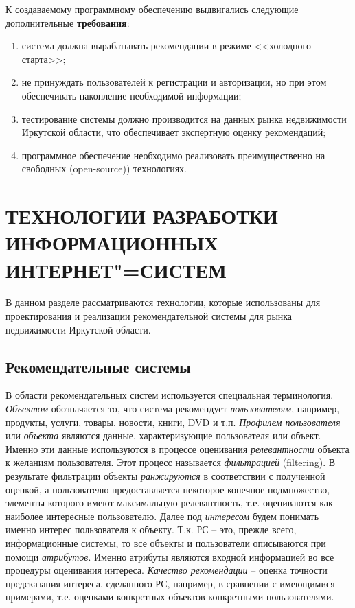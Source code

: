 \documentclass[a4paper,14pt,openany,final]{extreport} %
\begin{document}
К создаваемому программному обеспечению выдвигались следующие дополнительные \textbf{требования}:
\begin{enumerate}
\item система должна вырабатывать рекомендации в режиме <<холодного старта>>;
\item не принуждать пользователей к регистрации и авторизации, но при этом обеспечивать накопление необходимой информации;
\item тестирование системы должно производится на данных рынка недвижимости Иркутской области, что обеспечивает экспертную оценку рекомендаций;
\item программное обеспечение необходимо реализовать преимущественно на свободных (\foreignlanguage{english}{open-source)}) технологиях.
\end{enumerate}

\chapter{ТЕХНОЛОГИИ РАЗРАБОТКИ ИНФОРМАЦИОННЫХ ИНТЕРНЕТ"=СИСТЕМ}
\label{chap:dev-tech-theory}

В данном разделе рассматриваются технологии, которые использованы для проектирования и реализации рекомендательной системы для рынка недвижимости Иркутской области.

\section{Рекомендательные системы}
\label{sec:domain-descr}

В области рекомендательных систем используется специальная терминология. \emph{Объектом} обозначается то, что система рекомендует \emph{пользователям}, например, продукты, услуги, товары, новости, книги, DVD и т.п. \emph{Профилем пользователя} или \emph{объекта} являются данные, характеризующие пользователя или объект. Именно эти данные используются в процессе оценивания \emph{релевантности} объекта к желаниям пользователя. Этот процесс называется \emph{фильтрацией} (\foreignlanguage{english}{filtering}). В результате фильтрации объекты \emph{ранжируются} в соответствии с полученной оценкой, а пользователю предоставляется некоторое конечное подмножество, элементы которого имеют максимальную релевантность, т.е. оцениваются как наиболее интересные пользователю. Далее под \emph{интересом} будем понимать именно интерес пользователя к объекту. Т.к. РС -- это, прежде всего, информационные системы, то все объекты и пользователи описываются при помощи \emph{атрибутов}. Именно атрибуты являются входной информацией во все процедуры оценивания интереса. \emph{Качество рекомендации} -- оценка точности предсказания интереса, сделанного РС, например, в сравнении с имеющимися примерами, т.е. оценками конкретных объектов конкретными пользователями.
\end{document}
